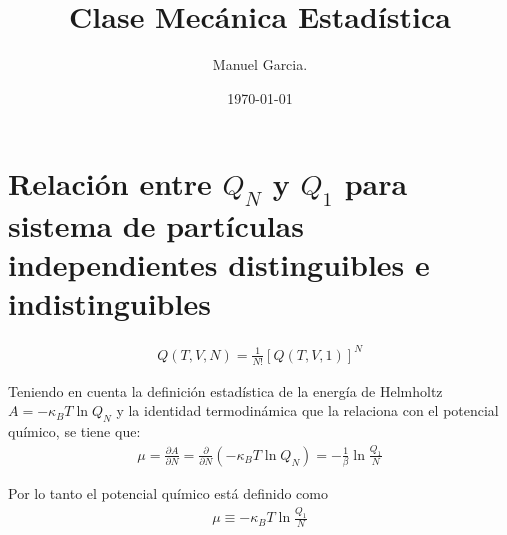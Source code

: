 \documentclass{article}
\title{Clase Mecánica Estadística }
\author{Manuel Garcia.}
\date{\today}
\begin{document}
\maketitle

\section{Relación entre $ Q_N  $ y $ Q_1  $ para sistema de partículas independientes distinguibles e indistinguibles } 
\begin{gather*}
  Q(T,V,N) = \frac{1}{N!} [Q(T,V,1 )] ^N
\end{gather*}

Teniendo en cuenta la definición estadística de la energía de Helmholtz $ A = -\kappa _{B } T \ln{Q_N } $ y la identidad termodinámica que la relaciona con el potencial químico, se tiene que: 
\begin{gather*}
  \mu = \frac{\partial A  }{\partial N } = \frac{\partial  }{\partial N }(- \kappa _{B } T \ln{Q_N }) = - \frac{1}{\beta} \ln{\frac{Q_1 }{N }} 
\end{gather*}

Por lo tanto el potencial químico está definido como 
\begin{gather*}
  \mu \equiv - \kappa_B T \ln{\frac{Q_1 }{N}} 
\end{gather*}
\end{document}
